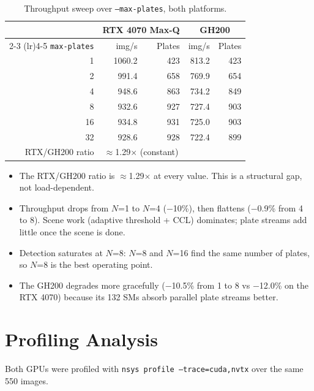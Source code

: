 \begin{table}[H]
\centering
\small
\begin{tabular}{rrrrr}
\toprule
 & \multicolumn{2}{c}{\textbf{RTX 4070 Max-Q}} & \multicolumn{2}{c}{\textbf{GH200}} \\
\cmidrule(lr){2-3} \cmidrule(lr){4-5}
\texttt{max-plates} & img/s & Plates & img/s & Plates \\
\midrule
 1 & 1060.2 & 423 &  813.2 & 423 \\
 2 &  991.4 & 658 &  769.9 & 654 \\
 4 &  948.6 & 863 &  734.2 & 849 \\
 8 &  932.6 & 927 &  727.4 & 903 \\
16 &  934.8 & 931 &  725.0 & 903 \\
32 &  928.6 & 928 &  722.4 & 899 \\
\midrule
RTX/GH200 ratio & \multicolumn{2}{c}{$\approx$1.29$\times$ (constant)} & & \\
\bottomrule
\end{tabular}
\normalsize
\caption{Throughput sweep over \texttt{--max-plates}, both platforms.}
\label{tab:sweep}
\end{table}

\begin{itemize}
  \item The RTX/GH200 ratio is $\approx$1.29$\times$ at every value. This is a structural gap, not load-dependent.
  \item Throughput drops from $N$=1 to $N$=4 ($-$10\%), then flattens ($-$0.9\% from 4 to 8). Scene work (adaptive threshold + CCL) dominates; plate streams add little once the scene is done.
  \item Detection saturates at $N$=8: $N$=8 and $N$=16 find the same number of plates, so $N$=8 is the best operating point.
  \item The GH200 degrades more gracefully ($-$10.5\% from 1 to 8 vs $-$12.0\% on the RTX 4070) because its 132 SMs absorb parallel plate streams better.
\end{itemize}

\section{Profiling Analysis}
\label{sec:profiling}

Both GPUs were profiled with \texttt{nsys profile --trace=cuda,nvtx} over the same 550 images.

